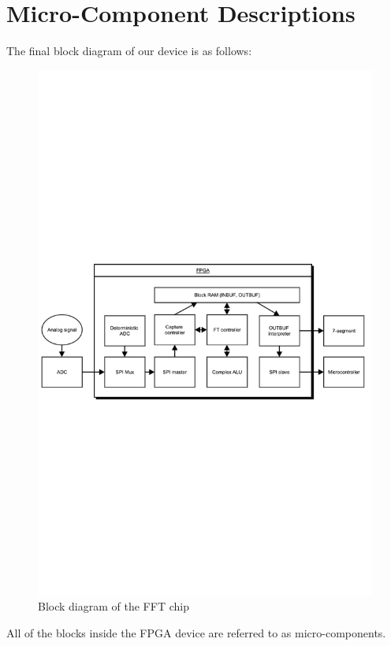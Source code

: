 \documentclass[12pt]{article}
\begin{document}
  \section*{Micro-Component Descriptions}
    The final block diagram of our device is as follows:
    \begin{figure}[H]
      \centering
      \includegraphics[trim=0 400 0 400,clip,width=140mm]{vhdl_fft.pdf}
      \caption{Block diagram of the FFT chip}
      \label{overflow}
    \end{figure}
    All of the blocks inside the FPGA device are referred to as micro-components.
\end{document}
